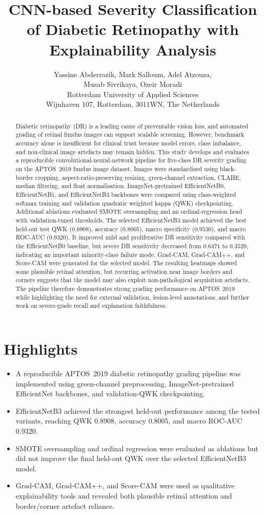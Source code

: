 \documentclass[11pt,a4paper]{article}
\title{CNN-based Severity Classification of Diabetic Retinopathy with Explainability Analysis}
\author{Yassine Abderrazik, Mark Salloum, Adel Atzouza,\\
Musab Sivrikaya, Ozeir Moradi\\
Rotterdam University of Applied Sciences\\
Wijnhaven 107, Rotterdam, 3011WN, The Netherlands}
\date{}
\begin{document}
\maketitle

\section*{Highlights}
\begin{itemize}
  \item A reproducible APTOS~2019 diabetic retinopathy grading pipeline was implemented using green-channel preprocessing, ImageNet-pretrained EfficientNet backbones, and validation-QWK checkpointing.
  \item EfficientNetB3 achieved the strongest held-out performance among the tested variants, reaching QWK \(0.8908\), accuracy \(0.8005\), and macro ROC-AUC \(0.9320\).
  \item SMOTE oversampling and ordinal regression were evaluated as ablations but did not improve the final held-out QWK over the selected EfficientNetB3 model.
  \item Grad-CAM, Grad-CAM++, and Score-CAM were used as qualitative explainability tools and revealed both plausible retinal attention and border/corner artefact reliance.
\end{itemize}

\begin{abstract}
Diabetic retinopathy (DR) is a leading cause of preventable vision loss, and automated grading of retinal fundus images can support scalable screening. However, benchmark accuracy alone is insufficient for clinical trust because model errors, class imbalance, and non-clinical image artefacts may remain hidden. This study develops and evaluates a reproducible convolutional-neural-network pipeline for five-class DR severity grading on the APTOS~2019 fundus image dataset. Images were standardised using black-border cropping, aspect-ratio-preserving resizing, green-channel extraction, CLAHE, median filtering, and float normalisation. ImageNet-pretrained EfficientNetB0, EfficientNetB1, and EfficientNetB3 backbones were compared using class-weighted softmax training and validation quadratic weighted kappa (QWK) checkpointing. Additional ablations evaluated SMOTE oversampling and an ordinal-regression head with validation-tuned thresholds. The selected EfficientNetB3 model achieved the best held-out test QWK (\(0.8908\)), accuracy (\(0.8005\)), macro specificity (\(0.9530\)), and macro ROC-AUC (\(0.9320\)). It improved mild and proliferative DR sensitivity compared with the EfficientNetB0 baseline, but severe DR sensitivity decreased from \(0.6471\) to \(0.3529\), indicating an important minority-class failure mode. Grad-CAM, Grad-CAM++, and Score-CAM were generated for the selected model. The resulting heatmaps showed some plausible retinal attention, but recurring activation near image borders and corners suggests that the model may also exploit non-pathological acquisition artefacts. The pipeline therefore demonstrates strong grading performance on APTOS~2019 while highlighting the need for external validation, lesion-level annotations, and further work on severe-grade recall and explanation faithfulness.
\end{abstract}
\end{document}
